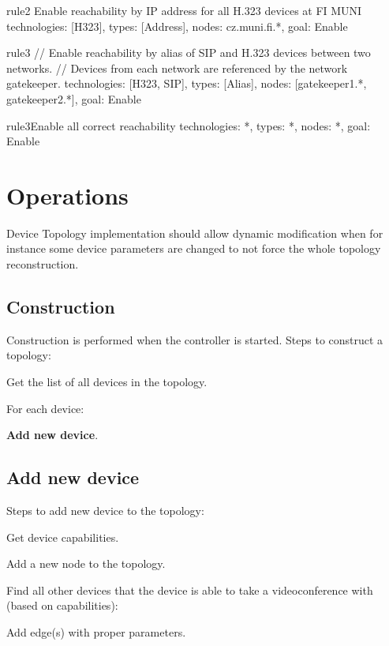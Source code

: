 \begin{ResourceExample}{}{rule2}%
      {Enable reachability by IP address for all H.323 devices at FI MUNI}
technologies: [H323],
types: [Address],
nodes: cz.muni.fi.*,
goal: Enable
\end{ResourceExample}

\begin{ResourceExample}{}{rule3}{}
// Enable reachability by alias of SIP and H.323 devices between two networks.
// Devices from each network are referenced by the network gatekeeper.
technologies: [H323, SIP],
types: [Alias],
nodes: [gatekeeper1.*, gatekeeper2.*],
goal: Enable
\end{ResourceExample}

\begin{ResourceExample}{}{rule3}{Enable all correct reachability}
technologies: *,
types: *,
nodes: *,
goal: Enable
\end{ResourceExample}

\section{Operations}

Device Topology implementation should allow dynamic modification when for 
instance some device parameters are changed to not force the whole topology 
reconstruction.      
      
\subsection*{Construction}

Construction is performed when the controller is started. Steps to construct a 
topology:

\begin{compactenum}
\item Get the list of all devices in the topology.
\item For each device: 
  \begin{compactitem}
  \item \textbf{Add new device}.
  \end{compactitem}
\end{compactenum}     

\subsection*{Add new device}     

Steps to add new device to the topology:
\begin{compactenum}
\item Get device capabilities.
\item Add a new node to the topology.
\item Find all other devices that the device is able to take a videoconference 
  with (based on capabilities):
  \begin{compactitem}
  \item Add edge(s) with proper parameters.
  \end{compactitem}
\end{compactenum}  

